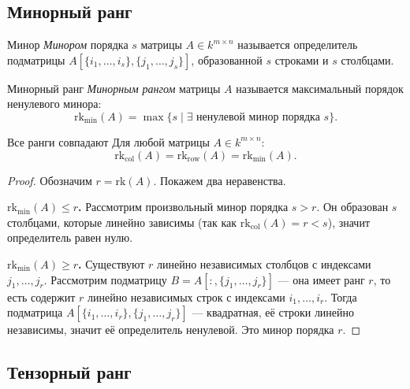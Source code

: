 \subsection{Минорный ранг}

\begin{Definition}{Минор}{}
    \emph{Минором} порядка $s$ матрицы $A \in k^{m \times n}$ называется определитель подматрицы $A[\{i_1,\ldots,i_s\},\{j_1,\ldots,j_s\}]$, образованной $s$ строками и $s$ столбцами.
\end{Definition}

\begin{Definition}{Минорный ранг}{}
    \emph{Минорным рангом} матрицы $A$ называется максимальный порядок ненулевого минора:
    \[
        \mathrm{rk}_{\mathrm{min}}(A) = \max\{s \mid \exists \text{ ненулевой минор порядка } s\}.
    \]
\end{Definition}

\begin{Theorem}{Все ранги совпадают}{}
    Для любой матрицы $A \in k^{m \times n}$:
    \[
        \mathrm{rk}_{\mathrm{col}}(A) = \mathrm{rk}_{\mathrm{row}}(A) = \mathrm{rk}_{\mathrm{min}}(A).
    \]
\end{Theorem}

\begin{proof}
Обозначим $r = \mathrm{rk}(A)$. Покажем два неравенства.

\textbf{$\mathrm{rk}_{\mathrm{min}}(A) \leq r$.} Рассмотрим произвольный минор порядка $s > r$. Он образован $s$ столбцами, которые линейно зависимы (так как $\mathrm{rk}_{\mathrm{col}}(A) = r < s$), значит определитель равен нулю.

\textbf{$\mathrm{rk}_{\mathrm{min}}(A) \geq r$.} Существуют $r$ линейно независимых столбцов с индексами $j_1, \ldots, j_r$. Рассмотрим подматрицу $B = A[{:},\{j_1,\ldots,j_r\}]$ — она имеет ранг $r$, то есть содержит $r$ линейно независимых строк с индексами $i_1, \ldots, i_r$. Тогда подматрица $A[\{i_1,\ldots,i_r\},\{j_1,\ldots,j_r\}]$ — квадратная, её строки линейно независимы, значит её определитель ненулевой. Это минор порядка $r$.
\end{proof}

\subsection{Тензорный ранг}

